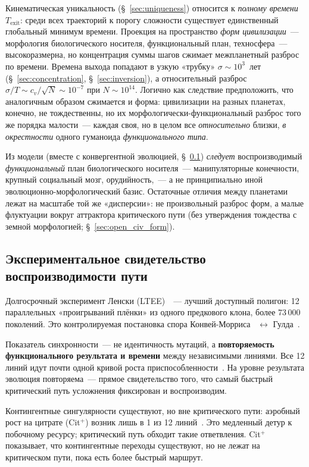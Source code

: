 \documentclass[12pt,a4paper]{article}
\begin{document}
Кинематическая уникальность (\S~\ref{sec:uniqueness}) относится к \emph{полному времени} $T_{\mathrm{exit}}$: среди всех траекторий к порогу сложности существует единственный глобальный минимум времени. Проекция на пространство \emph{форм цивилизации}~--- морфология биологического носителя, функциональный план, техносфера~--- высокоразмерна, но концентрация суммы шагов сжимает межпланетный разброс по времени. Времена выхода попадают в узкую «трубку» $\sigma \sim 10^3$~лет (\S~\ref{sec:concentration}, \S~\ref{sec:inversion}), а относительный разброс $\sigma/T \sim c_v/\sqrt{N} \sim 10^{-7}$ при $N \sim 10^{14}$. Логично как следствие предположить, что аналогичным образом сжимается и форма: цивилизации на разных планетах, конечно, не тождественны, но их морфологически-функциональный разброс того же порядка малости~--- каждая своя, но в целом все \emph{относительно} близки, \emph{в окрестности} одного гуманоида \emph{функционального типа}.

Из модели (вместе с конвергентной эволюцией, \S~\ref{sec:ltee}) \emph{следует} воспроизводимый \emph{функциональный} план биологического носителя~--- манипуляторные конечности, крупный социальный мозг, орудийность,~--- а не принципиально иной эволюционно-морфологический базис. Остаточные отличия между планетами лежат на масштабе той же «дисперсии»: не произвольный разброс форм, а малые флуктуации вокруг аттрактора критического пути (без утверждения тождества с земной морфологией; \S~\ref{sec:open_civ_form}).

\subsection{Экспериментальное свидетельство воспроизводимости пути}
\label{sec:ltee}

Долгосрочный эксперимент Ленски (LTEE)~\cite{Lenski2017}~--- лучший доступный полигон: 12 параллельных «проигрываний плёнки» из одного предкового клона, более 73\,000 поколений. Это контролируемая постановка спора Конвей-Морриса~\cite{ConwayMorris2003} $\leftrightarrow$ Гулда~\cite{Gould1989}.

Показатель синхронности~--- не идентичность мутаций, а \textbf{повторяемость функционального результата и времени} между независимыми линиями. Все 12 линий идут почти одной кривой роста приспособленности~\cite{Wiser2013,Lenski1994}. На уровне результата эволюция повторяема~--- прямое свидетельство того, что самый быстрый критический путь усложнения фиксирован и воспроизводим.

Контингентные сингулярности существуют, но вне критического пути: аэробный рост на цитрате (Cit$^+$) возник лишь в 1 из 12 линий~\cite{Blount2008,Blount2012}. Это медленный детур к побочному ресурсу; критический путь обходит такие ответвления. Cit$^+$ показывает, что контингентные переходы существуют, но не лежат на критическом пути, пока есть более быстрый маршрут.
\end{document}

